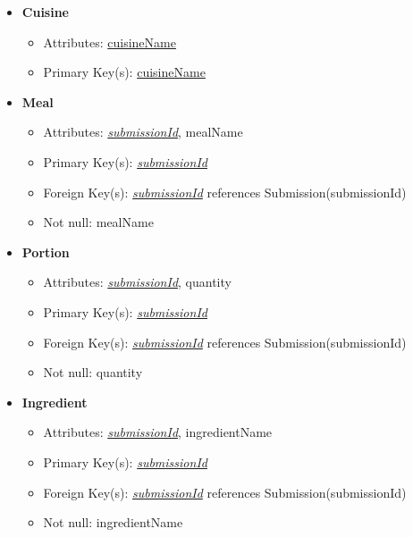 \documentclass{article}
\begin{document}
\begin{itemize}
        \item \textbf{Cuisine}
        \begin{itemize}
            \item Attributes: \underline{cuisineName}
            \item Primary Key(s): \underline{cuisineName}        
        \end{itemize}

        \item \textbf{Meal}
        \begin{itemize}
            \item Attributes: \underline{\textit{submissionId}}, mealName
            \item Primary Key(s): \underline{\textit{submissionId}}
            \item Foreign Key(s): \underline{\textit{submissionId}} references Submission(submissionId)
            \item Not null: mealName
        \end{itemize}

        \item \textbf{Portion}
        \begin{itemize}
            \item Attributes: \underline{\textit{submissionId}}, quantity
            \item Primary Key(s): \underline{\textit{submissionId}}
            \item Foreign Key(s): \underline{\textit{submissionId}} references Submission(submissionId)
            \item Not null: quantity
        \end{itemize}

        \item \textbf{Ingredient}
        \begin{itemize}
            \item Attributes: \underline{\textit{submissionId}}, ingredientName
            \item Primary Key(s): \underline{\textit{submissionId}}
            \item Foreign Key(s): \underline{\textit{submissionId}} references Submission(submissionId)
            \item Not null: ingredientName
        \end{itemize}


\end{itemize}
\end{document}
